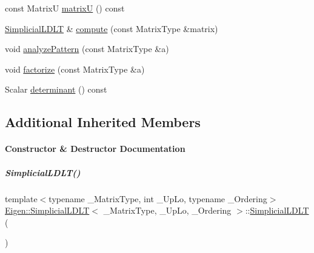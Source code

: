 \begin{DoxyCompactItemize}
const MatrixU \hyperlink{group___sparse_cholesky___module_ae98ed1c7ce8f9165adf5fb08cbb36b70}{matrixU} () const
\item 
\hyperlink{group___sparse_cholesky___module_class_eigen_1_1_simplicial_l_d_l_t}{Simplicial\+L\+D\+LT} \& \hyperlink{group___sparse_cholesky___module_a55429e59dbdf16a5696ee28bbf14e44f}{compute} (const Matrix\+Type \&matrix)
\item 
void \hyperlink{group___sparse_cholesky___module_aaf7c852056195d05de863362638517b7}{analyze\+Pattern} (const Matrix\+Type \&a)
\item 
void \hyperlink{group___sparse_cholesky___module_a8cf16bd92a712d36310397972bdef044}{factorize} (const Matrix\+Type \&a)
\item 
Scalar \hyperlink{group___sparse_cholesky___module_aa25042f3b49880f5e487d468ea20b1b7}{determinant} () const
\end{DoxyCompactItemize}
\subsection*{Additional Inherited Members}


\paragraph{Constructor \& Destructor Documentation}
\mbox{\label{group___sparse_cholesky___module_a3f26ae6105ffa36af9b8710e01e5caed}} 
\subparagraph{\texorpdfstring{Simplicial\+L\+D\+L\+T()}{SimplicialLDLT()}\hspace{0.1cm}{\footnotesize\ttfamily [1/4]}}
{\footnotesize\ttfamily template$<$typename \+\_\+\+Matrix\+Type, int \+\_\+\+Up\+Lo, typename \+\_\+\+Ordering$>$ \\
\hyperlink{group___sparse_cholesky___module_class_eigen_1_1_simplicial_l_d_l_t}{Eigen\+::\+Simplicial\+L\+D\+LT}$<$ \+\_\+\+Matrix\+Type, \+\_\+\+Up\+Lo, \+\_\+\+Ordering $>$\+::\hyperlink{group___sparse_cholesky___module_class_eigen_1_1_simplicial_l_d_l_t}{Simplicial\+L\+D\+LT} (\begin{DoxyParamCaption}{ }\end{DoxyParamCaption})\hspace{0.3cm}{\ttfamily [inline]}}

